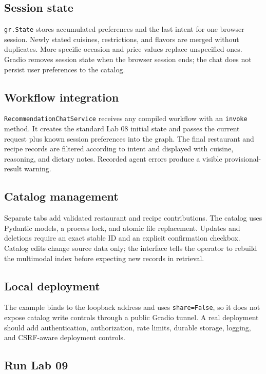 \documentclass[11pt]{article}
\begin{document}
\subsection{Session state}

\texttt{gr.State} stores accumulated preferences and the last intent for one
browser session. Newly stated cuisines, restrictions, and flavors are merged
without duplicates. More specific occasion and price values replace unspecified
ones. Gradio removes session state when the browser session ends; the chat does
not persist user preferences to the catalog.

\subsection{Workflow integration}

\texttt{RecommendationChatService} receives any compiled workflow with an
\texttt{invoke} method. It creates the standard Lab 08 initial state and passes
the current request plus known session preferences into the graph. The final
restaurant and recipe records are filtered according to intent and displayed
with cuisine, reasoning, and dietary notes. Recorded agent errors produce a
visible provisional-result warning.

\subsection{Catalog management}

Separate tabs add validated restaurant and recipe contributions. The catalog
uses Pydantic models, a process lock, and atomic file replacement. Updates and
deletions require an exact stable ID and an explicit confirmation checkbox.
Catalog edits change source data only; the interface tells the operator to
rebuild the multimodal index before expecting new records in retrieval.

\subsection{Local deployment}

The example binds to the loopback address and uses \texttt{share=False}, so it
does not expose catalog write controls through a public Gradio tunnel. A real
deployment should add authentication, authorization, rate limits, durable
storage, logging, and CSRF-aware deployment controls.

\subsection{Run Lab 09}
\end{document}
